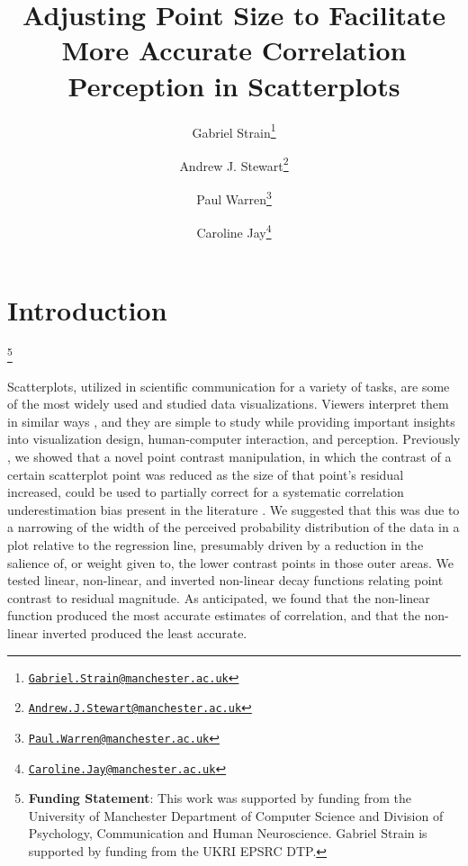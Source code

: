 \documentclass{vgtc}                          %
\title{Adjusting Point Size to Facilitate More Accurate Correlation Perception in Scatterplots}
\author{Gabriel Strain\thanks{\href{mailto:Gabriel.Strain@manchester.ac.uk}{\nolinkurl{Gabriel.Strain@manchester.ac.uk}}} %
\and Andrew J. Stewart\thanks{\href{mailto:Andrew.J.Stewart@manchester.ac.uk}{\nolinkurl{Andrew.J.Stewart@manchester.ac.uk}}} %
\and Paul Warren\thanks{\href{mailto:Paul.Warren@manchester.ac.uk}{\nolinkurl{Paul.Warren@manchester.ac.uk}}} %
\and Caroline Jay\thanks{\href{mailto:Caroline.Jay@manchester.ac.uk}{\nolinkurl{Caroline.Jay@manchester.ac.uk}}}} %
\affiliation{\scriptsize The University of Manchester}
\newcommand\blfootnote[1]{%
  \begingroup
  \renewcommand\thefootnote{}\footnote{#1}%
  \addtocounter{footnote}{-1}%
  \endgroup
}
\begin{document}

\firstsection{}

\maketitle

\hypertarget{introduction}{%
\section{Introduction}\label{introduction}}

\blfootnote{\textbf{Funding Statement}: This work was supported by funding from the University of Manchester Department of Computer Science and Division of Psychology, Communication and Human Neuroscience. Gabriel Strain is supported by funding from the UKRI EPSRC DTP.}

Scatterplots, utilized in scientific communication for a variety of tasks,
are some of the most widely used and studied data visualizations. Viewers
interpret them in similar ways \cite{kay_heer_2015}, and they are simple
to study while providing important insights into visualization
design, human-computer interaction, and perception. Previously \cite{strain_2023},
we showed that a novel point contrast manipulation, in which the contrast of a certain
scatterplot point was reduced as the size of that point's residual increased, could be
used to partially correct for a systematic correlation underestimation bias present in the
literature \cite{strahan_1978, bobko_1979, cleveland_1982, lane_1985, lauer_1989, 
collyer_1990, meyer_1992}. We suggested that this was due to a narrowing of the width
of the perceived probability distribution of the data in a plot relative to the regression line,
presumably driven by a reduction in the salience of, or weight given to, the lower
contrast points in those outer areas. We tested linear, non-linear,
and inverted non-linear decay functions relating point contrast to
residual magnitude. As anticipated, we found that the non-linear function produced
the most accurate estimates of correlation, and that the non-linear inverted produced
the least accurate.
\end{document}
